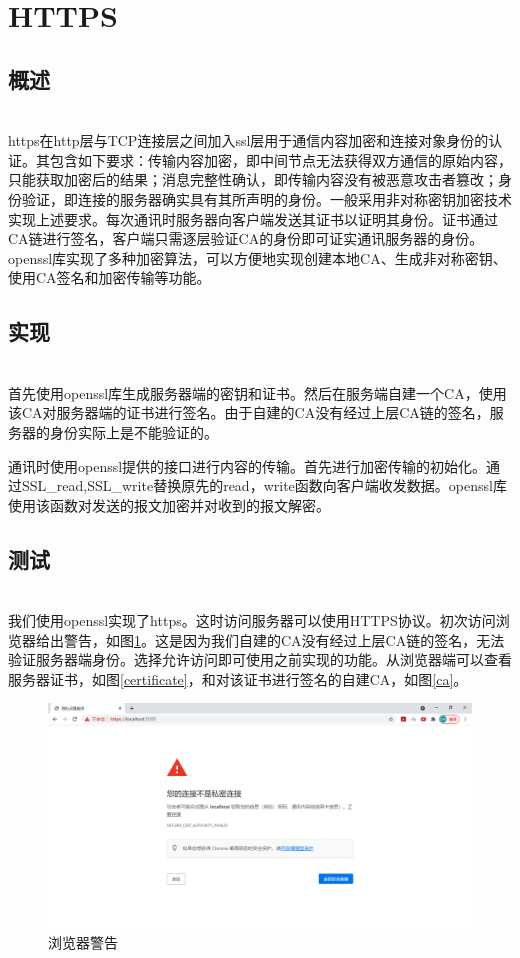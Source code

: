 \section{HTTPS}
\subsection{概述}
\ \\
https在http层与TCP连接层之间加入ssl层用于通信内容加密和连接对象身份的认证。其包含如下要求：传输内容加密，即中间节点无法获得双方通信的原始内容，只能获取加密后的结果；消息完整性确认，即传输内容没有被恶意攻击者篡改；身份验证，即连接的服务器确实具有其所声明的身份。一般采用非对称密钥加密技术实现上述要求。每次通讯时服务器向客户端发送其证书以证明其身份。证书通过CA链进行签名，客户端只需逐层验证CA的身份即可证实通讯服务器的身份。openssl库实现了多种加密算法，可以方便地实现创建本地CA、生成非对称密钥、使用CA签名和加密传输等功能。

\subsection{实现}
\ \\
首先使用openssl库生成服务器端的密钥和证书。然后在服务端自建一个CA，使用该CA对服务器端的证书进行签名。由于自建的CA没有经过上层CA链的签名，服务器的身份实际上是不能验证的。

通讯时使用openssl提供的接口进行内容的传输。首先进行加密传输的初始化。通过SSL_read,SSL_write替换原先的read，write函数向客户端收发数据。openssl库使用该函数对发送的报文加密并对收到的报文解密。

\subsection{测试}
\ \\
我们使用openssl实现了https。这时访问服务器可以使用HTTPS协议。初次访问浏览器给出警告，如图\ref{warning}。这是因为我们自建的CA没有经过上层CA链的签名，无法验证服务器端身份。选择允许访问即可使用之前实现的功能。从浏览器端可以查看服务器证书，如图\ref{certificate}，和对该证书进行签名的自建CA，如图\ref{ca}。
\begin{figure}
\begin{center}
\includegraphics[width=\textwidth]{figs/warning.PNG}
\end{center}
\caption{浏览器警告}
\label{warning}
\end{figure}

